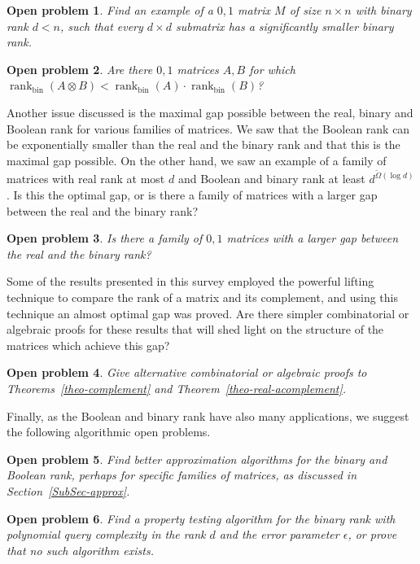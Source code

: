 \documentclass[11pt]{article}
\newtheorem{open}{Open problem}
\newcommand{\rank}{\mathop{\mathrm{rank}}}
\newcommand{\Rbin}{{\rank}_{\mathrm{bin}}}
\begin{document}
{{\begin{open}
\label{SmallWitness}
Find an example of a $0,1$ matrix $M$ of size $n \times n$ with binary rank $d < n$, such that every $d \times d$ submatrix has a significantly smaller binary rank.
\end{open}

\begin{open}
Are there $0,1$ matrices $A,B$ for which $\Rbin(A \otimes B) < \Rbin(A)\cdot \Rbin(B)$?
\end{open}

Another issue discussed is the maximal gap possible between the real, binary and Boolean rank for various families of matrices.
We saw that the Boolean rank can be exponentially smaller than the real and the binary rank and that this is the maximal gap possible.
On the other hand, we saw an example of a family of matrices with real rank at most $d$ and Boolean and binary rank at least $d^{\widetilde{\Omega}(\log d)}$.
Is this the optimal gap, or is there a family of matrices with a larger gap between the real and the binary rank?

\begin{open}
Is there a family of $0,1$ matrices with a larger gap between the real and the binary rank?
\end{open}

Some of the results presented in this survey employed the powerful lifting technique to compare the rank of a matrix and its complement, and using
this technique an almost optimal gap was proved.
Are there simpler combinatorial or algebraic proofs for these results that will shed light on the structure of the matrices which achieve this gap?
\begin{open}
Give alternative combinatorial or algebraic proofs to Theorems~\ref{theo-complement} and Theorem~\ref{theo-real-acomplement}.
\end{open}

Finally, as the Boolean and binary rank have also many applications, we suggest the following  algorithmic open problems.

\begin{open}
Find better approximation algorithms for the binary and Boolean rank, perhaps for specific families of matrices, as discussed in Section~\ref{SubSec-approx}.
\end{open}

\begin{open}
Find a property testing algorithm for the binary rank with polynomial query complexity in the rank $d$ and the error parameter $\epsilon$, or prove that no such algorithm exists.
\end{open}

}}
\end{document}
